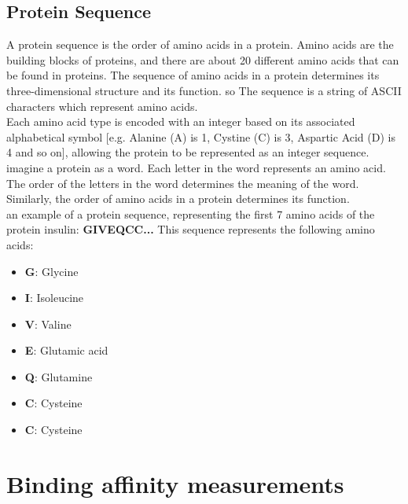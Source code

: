 \documentclass[11pt, a4paper]{article}
\begin{document}
    \subsection{Protein Sequence}
    A protein sequence is the order of amino acids in a protein. Amino acids are the building blocks of proteins, and there are about 20 different amino acids that can be found in proteins. The sequence of amino acids in a protein determines its three-dimensional structure and its function.
    so The sequence is a string of ASCII characters which represent amino
    acids. 
    \\Each amino acid type is encoded with an integer based on its
    associated alphabetical symbol [e.g. Alanine (A) is 1, Cystine (C) is
    3, Aspartic Acid (D) is 4 and so on], allowing the protein to be represented as an integer sequence.
    imagine a protein as a word. Each letter in the word represents an amino acid. The order of the letters in the word determines the meaning of the word. Similarly, the order of amino acids in a protein determines its function.
    \\ an example of a protein sequence, representing the first 7 amino acids of the protein insulin:
    \textbf{GIVEQCC...}
    This sequence represents the following amino acids:
    \begin{itemize}
        \item \textbf{G}: Glycine
        \item \textbf{I}: Isoleucine
        \item \textbf{V}: Valine 
        \item \textbf{E}: Glutamic acid
        \item \textbf{Q}: Glutamine
        \item \textbf{C}: Cysteine
        \item \textbf{C}: Cysteine    
    \end{itemize}

\section{Binding affinity measurements}
\end{document}
